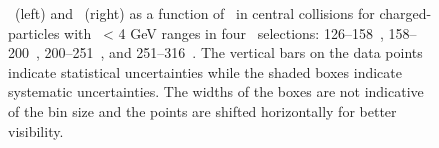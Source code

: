 \begin{figure}
   \caption{\RTheta\ (left) and \RP\ (right) as a function of \rvar\ in central collisions for charged-particles with \pt\ < 4 GeV ranges in four \ptjet\ selections: 126--158~\GeV, 158--200~\GeV, 200--251~\GeV, and 251--316~\GeV. The vertical bars on the data points indicate statistical uncertainties while the shaded boxes indicate systematic uncertainties. The widths of the boxes are not indicative of the bin size and the points are shifted horizontally for better visibility. }
      \label{fig:RPRT}
\end{figure}



%


